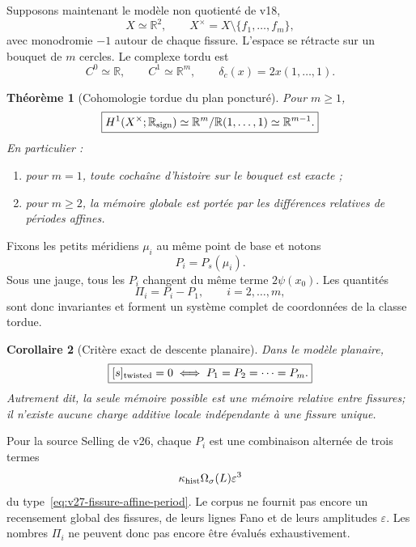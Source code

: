 \documentclass[11pt,a4paper]{article}
\newtheorem{theorem}{Théorème}[section]
\newtheorem{corollary}[theorem]{Corollaire}
\begin{document}
Supposons maintenant le modèle non quotienté de v18,
\[
 X\simeq\mathbb R^2,
 \qquad
 X^\times=X\setminus\{f_1,\ldots,f_m\},
\]
avec monodromie $-1$ autour de chaque fissure. L'espace se rétracte sur un bouquet de $m$ cercles. Le complexe tordu est
\[
 C^0\simeq\mathbb R,
 \qquad
 C^1\simeq\mathbb R^m,
 \qquad
 \delta_c(x)=2x(1,\ldots,1).
\]

\begin{theorem}[Cohomologie tordue du plan poncturé]\label{thm:v27-plane-twisted-H1}
Pour $m\ge1$,
\begin{equation}\label{eq:v27-plane-twisted-H1}
 \boxed{
 H^1(X^\times;\mathbb R_{\rm sign})
 \simeq
 \mathbb R^m/\mathbb R(1,\ldots,1)
 \simeq
 \mathbb R^{m-1}.}
\end{equation}
En particulier :
\begin{enumerate}[label=\textup{(\roman*)}]
\item pour $m=1$, toute cochaîne d'histoire sur le bouquet est exacte ;
\item pour $m\ge2$, la mémoire globale est portée par les différences relatives de périodes affines.
\end{enumerate}
\end{theorem}

Fixons les petits méridiens $\mu_i$ au même point de base et notons
\[
 P_i=P_s(\mu_i).
\]
Sous une jauge, tous les $P_i$ changent du même terme $2\psi(x_0)$. Les quantités
\begin{equation}\label{eq:v27-relative-periods}
 \boxed{
 \Pi_i=P_i-P_1,
 \qquad
 i=2,\ldots,m,}
\end{equation}
sont donc invariantes et forment un système complet de coordonnées de la classe tordue.

\begin{corollary}[Critère exact de descente planaire]\label{cor:v27-plane-exactness}
Dans le modèle planaire,
\begin{equation}\label{eq:v27-plane-exactness}
 \boxed{
 [s]_{\rm twisted}=0
 \iff
 P_1=P_2=\cdots=P_m.}
\end{equation}
Autrement dit, la seule mémoire possible est une \emph{mémoire relative entre fissures}; il n'existe aucune charge additive locale indépendante à une fissure unique.
\end{corollary}

Pour la source Selling de v26, chaque $P_i$ est une combinaison alternée de trois termes
\[
 \kappa_{\rm hist}\Omega_{\sigma}(L)\varepsilon^3
\]
du type~\eqref{eq:v27-fissure-affine-period}. Le corpus ne fournit pas encore un recensement global des fissures, de leurs lignes Fano et de leurs amplitudes $\varepsilon$. Les nombres $\Pi_i$ ne peuvent donc pas encore être évalués exhaustivement.
\end{document}
